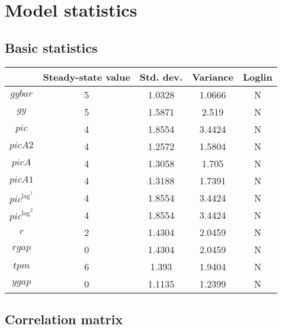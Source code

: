 \section{Model statistics}

\subsection{Basic statistics}

\begin{tabular}{c|c|c|c|c|}
  & Steady-state value & Std. dev. & Variance & Loglin\\
\hline
${g\!y\!b\!a\!r}$ & 5 & 1.0328 & 1.0666 & N    \\
${g\!y}$ & 5 & 1.5871 & 2.519 & N    \\
${p\!i\!c}$ & 4 & 1.8554 & 3.4424 & N    \\
${p\!i\!c\!A\!2}$ & 4 & 1.2572 & 1.5804 & N    \\
${p\!i\!c\!A}$ & 4 & 1.3058 & 1.705 & N    \\
${p\!i\!c\!A\!1}$ & 4 & 1.3188 & 1.7391 & N    \\
${p\!i\!c}^{\mathrm{lag}^{\mathrm{1}}}$ & 4 & 1.8554 & 3.4424 & N    \\
${p\!i\!c}^{\mathrm{lag}^{\mathrm{2}}}$ & 4 & 1.8554 & 3.4424 & N    \\
$r$ & 2 & 1.4304 & 2.0459 & N    \\
${r\!g\!a\!p}$ & 0 & 1.4304 & 2.0459 & N    \\
${t\!p\!m}$ & 6 & 1.393 & 1.9404 & N    \\
${y\!g\!a\!p}$ & 0 & 1.1135 & 1.2399 & N    \\
\hline
\end{tabular}


\subsection{Correlation matrix}

